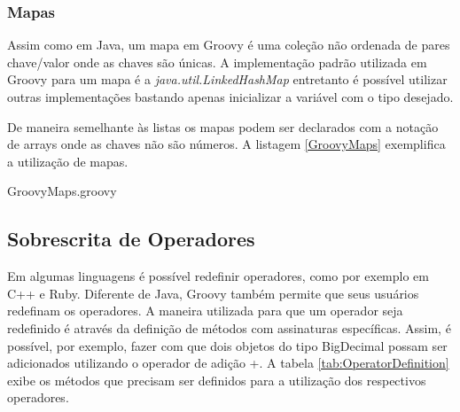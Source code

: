 \documentclass[12pt]{article}
\begin{document}
\subsubsection{Mapas}

    Assim como em Java, um mapa em Groovy é uma coleção não ordenada de pares 
    chave/valor onde as chaves são únicas. A implementação padrão utilizada em 
    Groovy para um mapa é a \emph{java.util.LinkedHashMap} entretanto é possível
    utilizar outras implementações bastando apenas inicializar a variável com o 
    tipo desejado.
    
    De maneira semelhante às listas os mapas podem ser declarados com a notação
    de arrays onde as chaves não são números. A listagem \ref{GroovyMaps} exemplifica
    a utilização de mapas.
    
    
                    {GroovyMaps.groovy}
	
\subsection{Sobrescrita de Operadores}	
	
	Em algumas linguagens é possível redefinir operadores, como por exemplo em C++ e
	Ruby. Diferente de Java, Groovy também permite que seus usuários redefinam os operadores.
	A maneira utilizada para que um operador seja redefinido é através da definição
	de métodos com assinaturas específicas. Assim, é possível, por exemplo, fazer com que dois
	objetos do tipo BigDecimal possam ser adicionados utilizando o operador de adição +. A tabela 
	\ref{tab:OperatorDefinition} exibe os métodos que precisam ser definidos para a utilização dos
	respectivos operadores.
\end{document}
